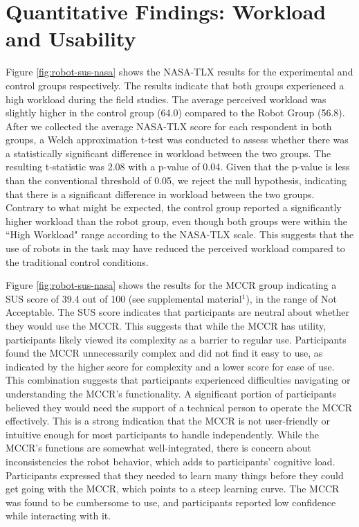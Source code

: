 \section{Quantitative Findings: Workload and Usability}
 \label{sec:quan_results}

Figure \ref{fig:robot-sus-nasa} shows the NASA-TLX results for the experimental and control groups respectively. 
The results indicate that both groups experienced a high workload during the field studies. 
The average perceived workload was slightly higher in the control group (64.0) compared to the Robot Group (56.8). 
After we collected the average NASA-TLX score for each respondent in both groups, a Welch approximation t-test was conducted to assess whether there was a statistically significant difference in workload between the two groups. 
The resulting t-statistic was 2.08 with a p-value of 0.04. 
Given that the p-value is less than the conventional threshold of 0.05, we reject the null hypothesis, indicating that there is a significant difference in workload between the two groups. 
Contrary to what might be expected, the control group reported a significantly higher workload than the robot group, even though both groups were within the ``High Workload" range according to the NASA-TLX scale. 
This suggests that the use of robots in the task may have reduced the perceived workload compared to the traditional control conditions. 

Figure \ref{fig:robot-sus-nasa} shows the results for the MCCR group indicating a SUS score of 39.4 out of 100 (see supplemental material$^1$), in the range of Not Acceptable.
The SUS score indicates that participants are neutral about whether they would use the MCCR. 
This suggests that while the MCCR has utility, participants likely viewed its complexity as a barrier to regular use.
Participants found the MCCR unnecessarily complex and did not find it easy to use, as indicated by the higher score for complexity and a lower score for ease of use. 
This combination suggests that participants experienced difficulties navigating or understanding the MCCR’s functionality.
A significant portion of participants believed they would need the support of a technical person to operate the MCCR effectively. This is a strong indication that the MCCR is not user-friendly or intuitive enough for most participants to handle independently.
While the MCCR’s functions are somewhat well-integrated, there is concern about inconsistencies the robot behavior, which adds to participants’ cognitive load.
Participants expressed that they needed to learn many things before they could get going with the MCCR, which points to a steep learning curve. 
The MCCR was found to be cumbersome to use, and participants reported low confidence while interacting with it.


